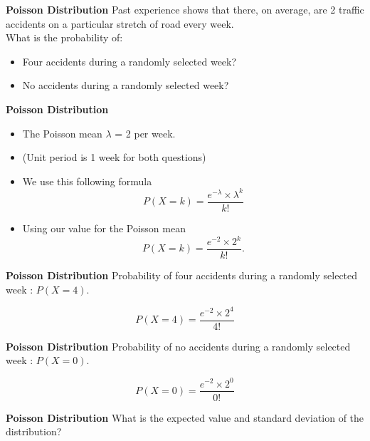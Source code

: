


\textbf{Poisson Distribution}
\Large
\vspace{-1.5cm}
Past experience shows that there, on average, are 2 traffic accidents on a particular stretch of road every week. 
\\
\bigskip
What is the probability of: 
\begin{itemize}

\item Four accidents during a randomly selected week?  

\item No accidents during a randomly selected week?  
\end{itemize}





\textbf{Poisson Distribution}
\Large
\vspace{-1.5cm}
\Large
\begin{itemize}

\item The Poisson mean $\lambda$ = 2  per week.
\item (Unit period is 1 week for both questions)
\item We use this following formula
\[ P(X=k) =  \frac{e^{-\lambda} \times \lambda ^k}{k!}  \]
\item Using our value for the Poisson mean
\[ P(X=k) =  \frac{e^{-2} \times 2^k}{k!} . \]

\end{itemize}



\textbf{Poisson Distribution}
\Large
\vspace{-2.5cm}
\Large
Probability of four accidents during a randomly selected week : $ P(X = 4)$.

\[ P(X=4) =  \frac{e^{-2} \times 2^4}{4!}  \]





\textbf{Poisson Distribution}
\Large
\vspace{-2.5cm}
\Large
Probability of no accidents during a randomly selected week : $ P(X = 0)$.

\[ P(X=0) =  \frac{e^{-2} \times 2^0}{0!}  \]



\textbf{Poisson Distribution}
\Large
\vspace{-1.5cm}
What is the expected value and standard deviation of the distribution? 




